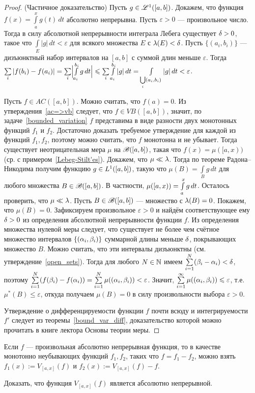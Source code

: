 \documentclass[10pt]{article}
\newcommand{\ve}{\varepsilon}
\begin{document}
\begin{proof}(Частичное доказательство)
Пусть $g\in \mathscr{L}^1([a,b])$. Докажем, что функция
$f(x)=\int\limits_a^xg(t)\,dt$ абсолютно непрерывна. Пусть $\ve>0$
--- произвольное число. Тогда в силу абсолютной непрерывности
интеграла Лебега существует $\delta>0$, такое что
$\int\limits_E|g|\,dt<\ve$ для всякого множества $E$ с $\lambda(E)<\delta$.
Пусть $\{(a_i,b_i)\}$ --- дизъюнктный набор интервалов на $[a,b]$ с
суммой длин меньше $\ve$. Тогда $\sum\limits_i|f(b_i)-f(a_i)|\bw
=\sum\limits_i\Bm{\int\limits_{a_i}^{b_i}g\,dt}\bw
\le\sum\limits_i\int\limits_{a_i}^{b_i}|g|\,dt\bw
=\int\limits_{\bigcup\limits_i(a_i,b_i)}|g|\,dt\bw <\ve$.

Пусть $f\in AC([a,b])$. Можно считать, что $f(a)=0$. Из
утверждения~\ref{ac=>vb} следует, что $f\in VB([a,b])$, значит, по
задаче~\ref{bounded_variation} $f$ представима в виде разности двух
монотонных функций $f_1$ и $f_2$. Достаточно доказать требуемое
утверждение для каждой из функций $f_1,f_2$, поэтому можно считать,
что $f$ монотонна и не убывает. Тогда существует неотрицательная
мера $\mu$ на $\mathscr{B}([a,b])$, такая что $f(x)=\mu([a,x))$ (ср. с
примером~\ref{Lebeg-Stilt'es}). Докажем, что $\mu\ll\lambda$. Тогда по
теореме Радона--Никодима получим функцию $g\bw \in L^1([a,b])$,
такую что $\mu(B)=\int\limits_Bg\,dt$ для любого множества
$B\in\mathscr{B}([a,b])$. В частности, $\mu([a,x))\bw
=\int\limits_a^xg\,dt$. Осталось проверить, что $\mu\ll\lambda$. Пусть
$B\in\mathscr{B}([a,b])$ --- множество с $\lambda(B)=0$. Покажем, что
$\mu(B)=0$. Зафиксируем произвольное $\ve>0$ и найдём
соответствующее ему $\delta>0$ из определения абсолютной непрерывности
функции $f$. Из определения множества нулевой меры следует, что
существует не более чем счётное множество интервалов
$\{(\alpha_i,\beta_i)\}$ суммарной длины меньше $\delta$, покрывающих
множество $B$. Можно считать, что эти интервалы дизъюнктны (см.
утверждение~\ref{open_sets}). Тогда для любого $N\in\mathbb{N}$ имеем
$\sum\limits_{i=1}^N(\be_i-\al_i)\bw <\de$, поэтому
$\sum\limits_{i=1}^N(f(\be_i)-f(\al_i))\bw
=\sum\limits_{i=1}^N\mu((\al_i,\be_i))\bw <\ve$. Значит,
$\sum\limits_{i=1}^\infty\mu((\al_i,\be_i))\bw \le\ve$, т.е.
$\mu^*(B)\le\ve$, откуда получаем $\mu(B)=0$ в силу произвольности
выбора $\ve>0$.

Утверждение о дифференцируемости функции $f$ почти всюду и
интегрируемости $f'$ следует из теоремы~\ref{bound_var_diff},
доказательство которой можно прочитать в книге лектора  Основы
теории меры.
\end{proof}

\begin{note}
Если $f$ --- произвольная абсолютно непрерывная функция, то в
качестве монотонно неубывающих функций $f_1,f_2$, таких что
$f=f_1-f_2$, можно взять $f_1(x):=V_{[a,x]}(f)$ и
$f_2(x):=V_{[a,x]}(f)-f$.
\end{note}
\begin{problem}
Доказать, что функция $V_{[a,x]}(f)$ является абсолютно непрерывной.
\end{problem}
\end{document}
